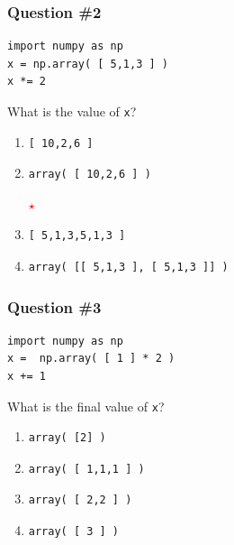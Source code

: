 \documentclass[11pt]{beamer}
\newcommand{\correctstar}{\textcolor{red}{$\star$}}
\begin{document}
\begin{frame}[fragile]
  \frametitle{Question \#2}
  \Enlarge

  \begin{Verbatim}
import numpy as np
x = np.array( [ 5,1,3 ] )
x *= 2
  \end{Verbatim}

  What is the value of \texttt{x}?

  \begin{enumerate}[label=\Alph*]
  \item
  \begin{Verbatim}
[ 10,2,6 ]
  \end{Verbatim}
  \item
  \begin{Verbatim}
array( [ 10,2,6 ] )
  \end{Verbatim}
  \correctstar
  \item
  \begin{Verbatim}
[ 5,1,3,5,1,3 ]
  \end{Verbatim}
  \item
  \begin{Verbatim}
array( [[ 5,1,3 ], [ 5,1,3 ]] )
  \end{Verbatim}
  \end{enumerate}
\end{frame}

\begin{frame}[fragile]
  \frametitle{Question \#3}
  \Enlarge

  \begin{Verbatim}
import numpy as np
x =  np.array( [ 1 ] * 2 )
x += 1
  \end{Verbatim}

  What is the final value of \texttt{x}?

  \begin{enumerate}[label=\Alph*]
  \item
  \begin{Verbatim}
array( [2] )
  \end{Verbatim}
  \item
  \begin{Verbatim}
array( [ 1,1,1 ] )
  \end{Verbatim}
  \item
  \begin{Verbatim}
array( [ 2,2 ] )
  \end{Verbatim}
  \item
  \begin{Verbatim}
array( [ 3 ] )
  \end{Verbatim}
  \end{enumerate}
\end{frame}
\end{document}
